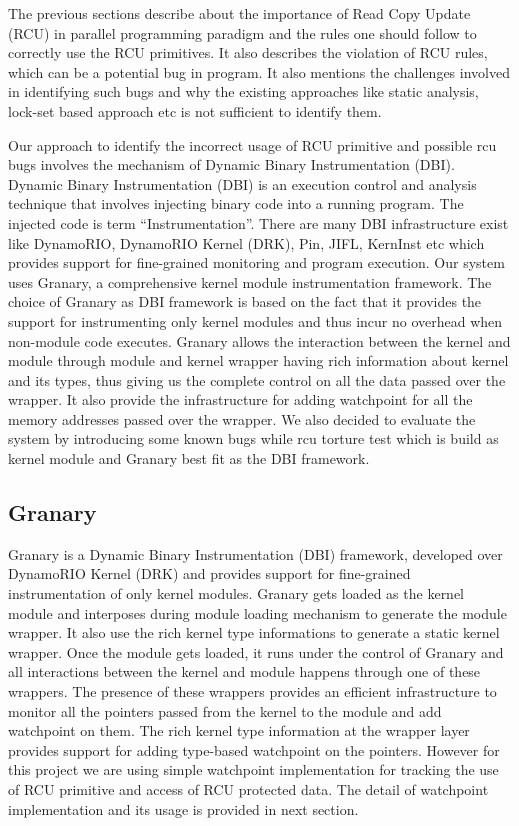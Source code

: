 The previous sections describe about the importance of Read Copy Update (RCU) in parallel programming paradigm and the rules one should follow to correctly use the RCU primitives. It also describes the violation of RCU rules, which can be a potential bug in program. It also mentions the challenges involved in identifying such bugs and why the existing approaches like static analysis, lock-set based approach etc is not sufficient to identify them.

Our approach to identify the incorrect usage of RCU primitive and possible rcu bugs involves the mechanism of Dynamic Binary Instrumentation (DBI). Dynamic Binary Instrumentation (DBI) is an execution control and analysis technique that involves injecting binary code into a running program. The injected code is term “Instrumentation”. There are many DBI infrastructure exist like DynamoRIO, DynamoRIO Kernel (DRK),  Pin, JIFL, KernInst etc which provides support for fine-grained monitoring and program execution. Our system uses Granary, a comprehensive kernel module instrumentation framework. The choice of Granary as DBI framework is based on the fact that it provides the support for instrumenting only kernel modules and thus incur no overhead when non-module code executes. Granary allows the interaction between the kernel and module through module and kernel wrapper having rich information about kernel and its types, thus giving us the complete control on all the data passed over the wrapper. It also provide the infrastructure for adding watchpoint for all the memory addresses passed over the wrapper. We also decided to evaluate the system by introducing some known bugs while rcu torture test which is build as kernel module and Granary best fit as the DBI framework. 


\subsection{Granary}
Granary is a Dynamic Binary Instrumentation (DBI) framework, developed over DynamoRIO Kernel (DRK) and provides support for fine-grained instrumentation of only kernel modules. Granary gets loaded as the kernel module and interposes during module loading mechanism to generate the module wrapper. It also use the rich kernel type informations to generate a static kernel wrapper. Once the module gets loaded, it runs under the control of Granary and all interactions between the kernel and module happens through one of these wrappers. The presence of these wrappers provides an efficient infrastructure to monitor all the pointers passed from the kernel to the module and add watchpoint on them. The rich kernel type information at the wrapper layer provides support for adding type-based watchpoint on the pointers. However for this project we are using simple watchpoint implementation for tracking the use of RCU primitive and access of RCU protected data. The detail of watchpoint implementation and its usage is provided in next section. 



